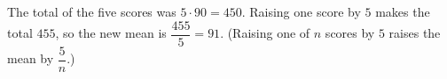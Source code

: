 The total of the five scores was $5\cdot90=450$. Raising one score by $5$ makes the total $455$, so the new mean is $\dfrac{455}{5}=\boxed{91}$. (Raising one of $n$ scores by $5$ raises the mean by $\dfrac{5}{n}$.)
